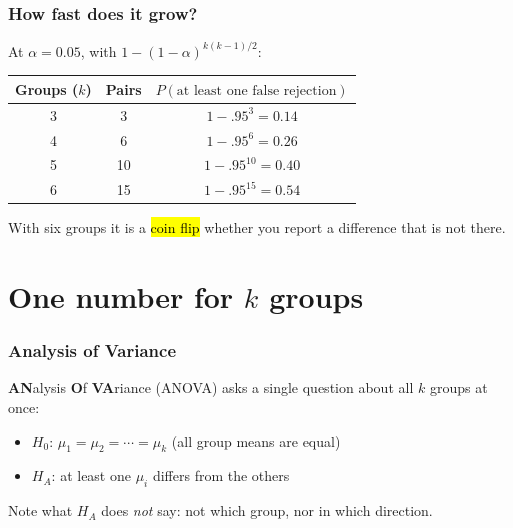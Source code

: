 \documentclass[slidestop,compress,mathserif]{beamer}
\begin{document}
\begin{frame}
\frametitle{How fast does it grow?}

At $\alpha = 0.05$, with $1 - (1 - \alpha)^{k(k-1)/2}$:

\vspace{-0.2em}
\begin{center}
{\small
\begin{tabular}{ccc}
\toprule
Groups ($k$) & Pairs & $P(\text{at least one false rejection})$ \\
\midrule
3 & 3 & $1 - .95^{3} = 0.14$ \\
4 & 6 & $1 - .95^{6} = 0.26$ \\
5 & 10 & $1 - .95^{10} = 0.40$ \\
6 & 15 & $1 - .95^{15} = 0.54$ \\
\bottomrule
\end{tabular}}
\end{center}

\pause
\vspace{0.2em}
With six groups it is a \hl{coin flip} whether you report a difference that is not there.

\pause
{}

\end{frame}



\section{One number for $k$ groups}

\begin{frame}
\frametitle{Analysis of Variance}

\textbf{AN}alysis \textbf{O}f \textbf{VA}riance (ANOVA) asks a single question about all $k$ groups at once:

\begin{itemize}
\item $H_0$: $\mu_1 = \mu_2 = \cdots = \mu_k$ \quad (all group means are equal)
\item $H_A$: at least one $\mu_i$ differs from the others
\end{itemize}

\pause
Note what $H_A$ does \emph{not} say: not which group, nor in which direction.

\pause
{}

\end{frame}
\end{document}
